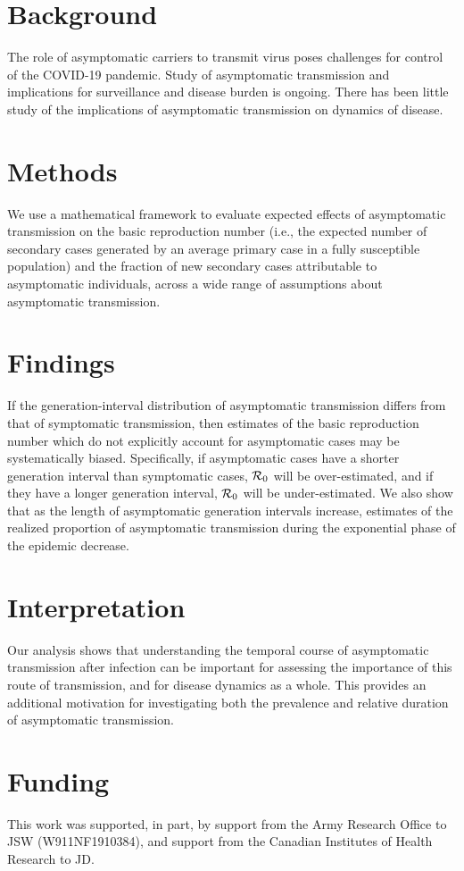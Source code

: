 {\footnotesize 
\section*{Background}

The role of asymptomatic carriers to transmit virus poses challenges for control of the COVID-19 pandemic. 
Study of asymptomatic transmission and implications for surveillance and disease burden is ongoing. 
There has been little study of the implications of asymptomatic transmission on dynamics of disease.

\section*{Methods}

We use a mathematical framework to evaluate expected effects of asymptomatic transmission on the basic reproduction number (i.e., the expected number of secondary cases generated by an average primary case in a fully susceptible population) and the fraction of new secondary cases attributable to asymptomatic individuals, across a wide range of assumptions about asymptomatic transmission.

\section*{Findings}

If the generation-interval distribution of asymptomatic transmission differs from that of symptomatic transmission, then estimates of the basic reproduction number which do not explicitly account for asymptomatic cases may be systematically biased. 
Specifically, if asymptomatic cases have a shorter generation interval than symptomatic cases, ${\cal{R}}_0$ will be over-estimated, and if they have a longer generation interval, ${\cal{R}}_0$ will be under-estimated.
We also show that as the length of asymptomatic generation intervals increase, estimates of the realized proportion of asymptomatic transmission during the exponential phase of the epidemic decrease.

\section*{Interpretation}

Our analysis shows that understanding the temporal course of asymptomatic transmission after infection can be important for assessing the importance of this route of transmission, and for disease dynamics as a whole. This provides an additional motivation for investigating both the prevalence and relative duration of asymptomatic transmission. 

\section*{Funding}

This work was supported, in part, by support from the Army Research Office to JSW (W911NF1910384), and support from the Canadian Institutes of Health Research to JD.}
